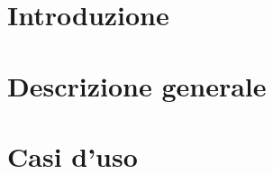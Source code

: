 \documentclass{article}
\begin{document}


\section{Introduzione}%
\label{sec:introduzione}


\newpage

\section{Descrizione generale}
\label{sec:decrizione_generale}


\newpage

\section{Casi d'uso}
\label{sec:casi_duso}

\end{document}
